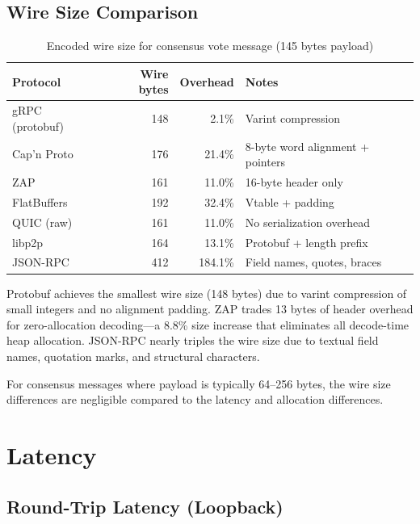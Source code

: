 \documentclass[11pt,letterpaper]{article}
\begin{document}
\subsection{Wire Size Comparison}

\begin{table}[h]
\centering
\caption{Encoded wire size for consensus vote message (145 bytes payload)}
\label{tab:wiresize}
\begin{tabular}{lrrl}
\toprule
\textbf{Protocol} & \textbf{Wire bytes} & \textbf{Overhead} & \textbf{Notes} \\
\midrule
gRPC (protobuf) & 148 & 2.1\% & Varint compression \\
Cap'n Proto & 176 & 21.4\% & 8-byte word alignment + pointers \\
\rowcolor{luxblue!10}
ZAP & 161 & 11.0\% & 16-byte header only \\
FlatBuffers & 192 & 32.4\% & Vtable + padding \\
QUIC (raw) & 161 & 11.0\% & No serialization overhead \\
libp2p & 164 & 13.1\% & Protobuf + length prefix \\
JSON-RPC & 412 & 184.1\% & Field names, quotes, braces \\
\bottomrule
\end{tabular}
\end{table}

Protobuf achieves the smallest wire size (148 bytes) due to varint compression of small integers and no alignment padding. ZAP trades 13 bytes of header overhead for zero-allocation decoding---a 8.8\% size increase that eliminates all decode-time heap allocation. JSON-RPC nearly triples the wire size due to textual field names, quotation marks, and structural characters.

For consensus messages where payload is typically 64--256 bytes, the wire size differences are negligible compared to the latency and allocation differences.

\section{Latency}

\subsection{Round-Trip Latency (Loopback)}
\end{document}
